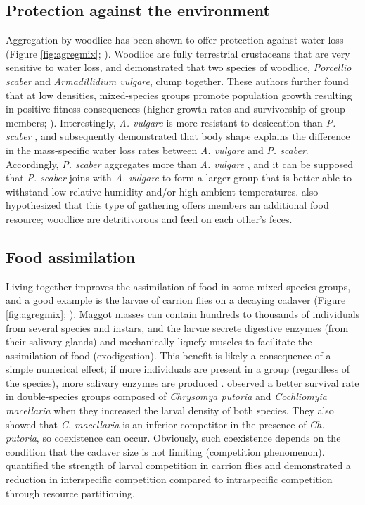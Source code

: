 		\subsection{Protection against the environment}
Aggregation by woodlice has been shown to offer protection against water loss (Figure \ref{fig:agregmix}; \cite{broly_effects_2014}). Woodlice are fully terrestrial crustaceans that are very sensitive to water loss, and \citet{hassall_effects_2005} demonstrated that two species of woodlice, \textit{Porcellio scaber} and \textit{Armadillidium vulgare}, clump together. These authors further found that at low densities, mixed-species groups promote population growth resulting in positive fitness consequences (higher growth rates and survivorship of group members; \cite{hassall_effects_2005}). Interestingly, \textit{A. vulgare} is more resistant to desiccation than \textit{P. scaber} \cite{hassall_effects_2005}, and \citet{broly_body_2015} subsequently demonstrated that body shape explains the difference in the mass-specific water loss rates between \textit{A. vulgare} and \textit{P. scaber}. Accordingly, \textit{P. scaber} aggregates more than \textit{A. vulgare} \cite{hassall_predicting_2010}, and it can be supposed that \textit{P. scaber} joins with \textit{A. vulgare} to form a larger group that is better able to withstand low relative humidity and/or high ambient temperatures. \citet{hassall_effects_2005} also hypothesized that this type of gathering offers members an additional food resource; woodlice are detritivorous and feed on each other’s feces.

		\subsection{Food assimilation}
Living together improves the assimilation of food in some mixed-species groups, and a good example is the larvae of carrion flies on a decaying cadaver (Figure \ref{fig:agregmix}; \cite{rivers_physiological_2011}). Maggot masses can contain hundreds to thousands of individuals from several species and instars, and the larvae secrete digestive enzymes (from their salivary glands) and mechanically liquefy muscles to facilitate the assimilation of food (exodigestion). This benefit is likely a consequence of a simple numerical effect; if more individuals are present in a group (regardless of the species), more salivary enzymes are produced \cite{wilson_impacts_2015}. \citet{dos_reis_larval_1999} observed a better survival rate in double-species groups composed of \textit{Chrysomya putoria} and \textit{Cochliomyia macellaria} when they increased the larval density of both species. They also showed that \textit{C. macellaria} is an inferior competitor in the presence of \textit{Ch. putoria}, so coexistence can occur. Obviously, such coexistence depends on the condition that the cadaver size is not limiting (competition phenomenon). \citet{ives_aggregation_1991} quantified the strength of larval competition in carrion flies and demonstrated a reduction in interspecific competition compared to intraspecific competition through resource partitioning.


